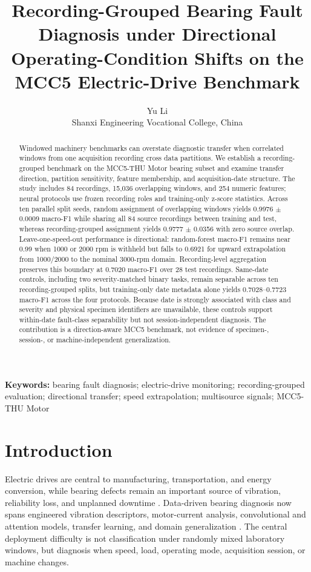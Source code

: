 \documentclass[11pt]{article}
\title{Recording-Grouped Bearing Fault Diagnosis under Directional Operating-Condition Shifts on the MCC5 Electric-Drive Benchmark}
\author{Yu Li\\Shanxi Engineering Vocational College, China}
\date{}
\begin{document}
\maketitle
\begin{abstract}
Windowed machinery benchmarks can overstate diagnostic transfer when correlated windows from one acquisition recording cross data partitions. We establish a recording-grouped benchmark on the MCC5-THU Motor bearing subset and examine transfer direction, partition sensitivity, feature membership, and acquisition-date structure. The study includes 84 recordings, 15,036 overlapping windows, and 254 numeric features; neural protocols use frozen recording roles and training-only z-score statistics. Across ten parallel split seeds, random assignment of overlapping windows yields 0.9976 $\pm$ 0.0009 macro-F1 while sharing all 84 source recordings between training and test, whereas recording-grouped assignment yields 0.9777 $\pm$ 0.0356 with zero source overlap. Leave-one-speed-out performance is directional: random-forest macro-F1 remains near 0.99 when 1000 or 2000 rpm is withheld but falls to 0.6921 for upward extrapolation from 1000/2000 to the nominal 3000-rpm domain. Recording-level aggregation preserves this boundary at 0.7020 macro-F1 over 28 test recordings. Same-date controls, including two severity-matched binary tasks, remain separable across ten recording-grouped splits, but training-only date metadata alone yields 0.7028--0.7723 macro-F1 across the four protocols. Because date is strongly associated with class and severity and physical specimen identifiers are unavailable, these controls support within-date fault-class separability but not session-independent diagnosis. The contribution is a direction-aware MCC5 benchmark, not evidence of specimen-, session-, or machine-independent generalization.
\end{abstract}
\noindent\textbf{Keywords:} bearing fault diagnosis; electric-drive monitoring; recording-grouped evaluation; directional transfer; speed extrapolation; multisource signals; MCC5-THU Motor

\section{Introduction}
Electric drives are central to manufacturing, transportation, and energy conversion, while bearing defects remain an important source of vibration, reliability loss, and unplanned downtime \cite{Lei2020Roadmap,Zio2021PHM,Fernandes2022IndustrialReview,Zonta2024AIPdM}. Data-driven bearing diagnosis now spans engineered vibration descriptors, motor-current analysis, convolutional and attention models, transfer learning, and domain generalization \cite{Zhang2020DLBearingReview,Neupane2020CWRUReview,Tama2022DLVibrationReview,Chen2023DeepTransferReview,Xiao2024DGSurvey}. The central deployment difficulty is not classification under randomly mixed laboratory windows, but diagnosis when speed, load, operating mode, acquisition session, or machine changes.
\end{document}

